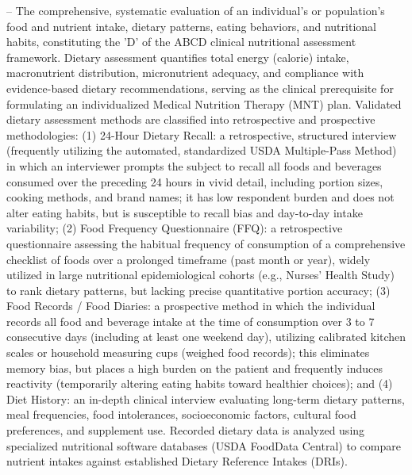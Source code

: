 -- The comprehensive, systematic evaluation of an individual's or population's food and nutrient intake, dietary patterns, eating behaviors, and nutritional habits, constituting the 'D' of the ABCD clinical nutritional assessment framework. Dietary assessment quantifies total energy (calorie) intake, macronutrient distribution, micronutrient adequacy, and compliance with evidence-based dietary recommendations, serving as the clinical prerequisite for formulating an individualized Medical Nutrition Therapy (MNT) plan. Validated dietary assessment methods are classified into retrospective and prospective methodologies: (1) 24-Hour Dietary Recall: a retrospective, structured interview (frequently utilizing the automated, standardized USDA Multiple-Pass Method) in which an interviewer prompts the subject to recall all foods and beverages consumed over the preceding 24 hours in vivid detail, including portion sizes, cooking methods, and brand names; it has low respondent burden and does not alter eating habits, but is susceptible to recall bias and day-to-day intake variability; (2) Food Frequency Questionnaire (FFQ): a retrospective questionnaire assessing the habitual frequency of consumption of a comprehensive checklist of foods over a prolonged timeframe (past month or year), widely utilized in large nutritional epidemiological cohorts (e.g., Nurses' Health Study) to rank dietary patterns, but lacking precise quantitative portion accuracy; (3) Food Records / Food Diaries: a prospective method in which the individual records all food and beverage intake at the time of consumption over 3 to 7 consecutive days (including at least one weekend day), utilizing calibrated kitchen scales or household measuring cups (weighed food records); this eliminates memory bias, but places a high burden on the patient and frequently induces reactivity (temporarily altering eating habits toward healthier choices); and (4) Diet History: an in-depth clinical interview evaluating long-term dietary patterns, meal frequencies, food intolerances, socioeconomic factors, cultural food preferences, and supplement use. Recorded dietary data is analyzed using specialized nutritional software databases (USDA FoodData Central) to compare nutrient intakes against established Dietary Reference Intakes (DRIs).

